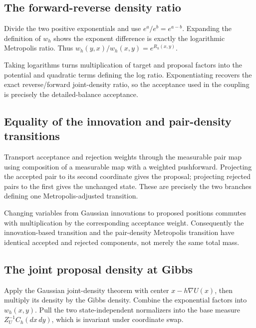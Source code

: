 \documentclass[11pt,a4paper]{article}
\begin{document}
\subsection{\texorpdfstring{The forward-reverse density ratio}{The forward-reverse density ratio}}


Divide the two positive exponentials and use \(e^a/e^b=e^{a-b}\). Expanding the definition of \(w_h\) shows the exponent difference is exactly the logarithmic Metropolis ratio. Thus \(w_h(y,x)/w_h(x,y)=e^{R_h(x,y)}\).



Taking logarithms turns multiplication of target and proposal factors into the potential and quadratic terms defining the log ratio. Exponentiating recovers the exact reverse/\allowbreak{}forward joint-density ratio, so the acceptance used in the coupling is precisely the detailed-balance acceptance.


\subsection{\texorpdfstring{Equality of the innovation and pair-density transitions}{Equality of the innovation and pair-density transitions}}


Transport acceptance and rejection weights through the measurable pair map using composition of a measurable map with a weighted pushforward. Projecting the accepted pair to its second coordinate gives the proposal; projecting rejected pairs to the first gives the unchanged state. These are precisely the two branches defining one Metropolis-adjusted transition.



Changing variables from Gaussian innovations to proposed positions commutes with multiplication by the corresponding acceptance weight. Consequently the innovation-based transition and the pair-density Metropolis transition have identical accepted and rejected components, not merely the same total mass.


\subsection{\texorpdfstring{The joint proposal density at Gibbs}{The joint proposal density at Gibbs}}


Apply the Gaussian joint-density theorem with center \(x-h\nabla U(x)\), then multiply its density by the Gibbs density. Combine the exponential factors into \(w_h(x,y)\). Pull the two state-independent normalizers into the base measure \(Z_U^{-1}C_h(dx\,dy)\), which is invariant under coordinate swap.
\end{document}
